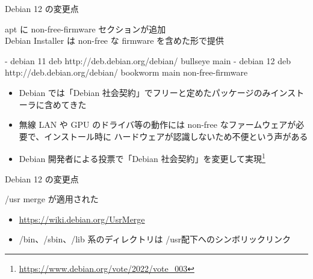 
%

\begin{frame}[containsverbatim]{Debian 12 の変更点}

apt に non-free-firmware セクションが追加 \\
Debian Installer は non-free な firmware を含めた形で提供

\begin{commandlinesmall}
- debian 11
  deb http://deb.debian.org/debian/ bullseye main
- debian 12
  deb http://deb.debian.org/debian/ bookworm main non-free-firmware
\end{commandlinesmall}

\begin{itemize}
\item Debian では「Debian 社会契約」でフリーと定めたパッケージのみインストーラに含めてきた
\item 無線 LAN や GPU のドライバ等の動作には non-free なファームウェアが必要で、インストール時に ハードウェアが認識しないため不便という声がある
\item Debian 開発者による投票で「Debian 社会契約」を変更して実現\footnote{\url{https://www.debian.org/vote/2022/vote_003}}
\end{itemize}

\end{frame}


\begin{frame}[containsverbatim]{Debian 12 の変更点}

/usr merge が適用された

\begin{itemize}
\item \url{https://wiki.debian.org/UsrMerge}
\item /bin、/sbin、/lib 系のディレクトリは /usr配下へのシンボリックリンク
\end{itemize}


\end{frame}


